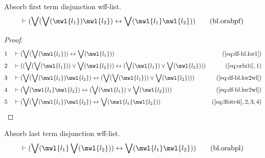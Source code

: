 \begin{lemma} {Absorb first term disjunction wff-list.}
\begin{align}
\vdash ( \bigvee( \bigvee( \mwl{l_1} ) \mwl{l_2} ) \leftrightarrow \bigvee(
    \mwl{l_1} \mwl{l_2} ) )\label{eq:bl.orabpf}\tag{bl.orabpf}
\end{align}
\end{lemma}


\begin{proof}
\begin{align}
  1 &&  & \vdash ( \bigvee( \bigvee( \mwl{l_1} ) ) \leftrightarrow \bigvee(
     \mwl{l_1} ) )&(\mbox{\ref{eq:df-bl.lor1}})\notag
  \\ 2 &&  & \vdash ( ( \bigvee( \bigvee( \mwl{l_1} ) ) \vee \bigvee( \mwl{l_2}
     ) ) \leftrightarrow ( \bigvee( \mwl{l_1} ) \vee
     \bigvee( \mwl{l_2} ) )
     )&(\mbox{\ref{eq:orbi1i}},1)\notag
  \\ 3 &&  & \vdash ( \bigvee( \bigvee( \mwl{l_1} ) \mwl{l_2} ) \leftrightarrow
     ( \bigvee( \bigvee( \mwl{l_1} ) ) \vee \bigvee(
     \mwl{l_2} ) ) )&(\mbox{\ref{eq:df-bl.lor2wl}})\notag
  \\ 4 &&  & \vdash ( \bigvee( \mwl{l_1} \mwl{l_2} ) \leftrightarrow ( \bigvee(
     \mwl{l_1} ) \vee \bigvee( \mwl{l_2} ) )
     )&(\mbox{\ref{eq:df-bl.lor2wl}})\notag
  \\ 5 &&  & \vdash ( \bigvee( \bigvee( \mwl{l_1} ) \mwl{l_2} ) \leftrightarrow
     \bigvee( \mwl{l_1} \mwl{l_2} )
     )&(\mbox{\ref{eq:3bitr4i}},2,3,4)\notag
\end{align}
\end{proof}

\begin{lemma} {Absorb last term disjunction wff-list.}
\begin{align}
\vdash ( \bigvee( \mwl{l_1} \bigvee( \mwl{l_2} ) ) \leftrightarrow \bigvee(
    \mwl{l_1} \mwl{l_2} ) )\label{eq:bl.orabpl}\tag{bl.orabpl}
\end{align}
\end{lemma}


